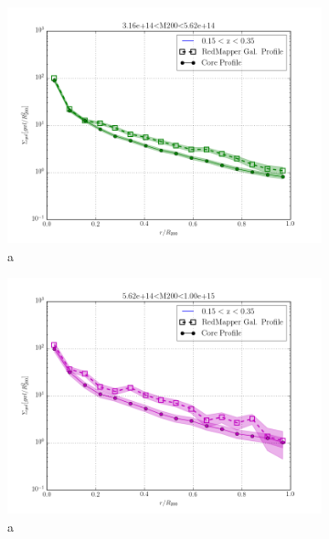 \documentclass[twocolumn]{article}
\begin{document}
\begin{figure}
\begin{subfigure}{.5\textwidth}
    \centering\includegraphics[width=1.0\linewidth]{figs/cfn/basic_rd_rm.param/plot_zmrs.py/fig4.png}
    \caption{a}
  \end{subfigure}%
  \begin{subfigure}{.5\textwidth}
    \centering\includegraphics[width=1.0\linewidth]{figs/cfn/basic_rd_rm.param/plot_zmrs.py/fig5.png}
    \caption{a}
  \end{subfigure}
  \begin{subfigure}{.5\textwidth}

\end{subfigure}
\end{figure}
\end{document}
